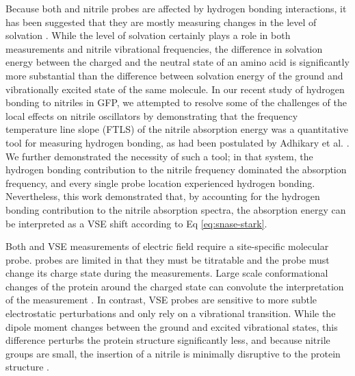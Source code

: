 Because both \pKa{} and nitrile probes are affected by hydrogen bonding interactions, it has been suggested that they are mostly measuring changes in the level of solvation \cite{Adhikary2014, Adhikary2015, Simonson2004}. 
While the level of solvation certainly plays a role in both \dpKa{} measurements and nitrile vibrational frequencies, the difference in solvation energy between the charged and the neutral state of an amino acid is significantly more substantial than the difference between solvation energy of the ground and vibrationally excited state of the same molecule. 
In our recent study of hydrogen bonding to nitriles in GFP, we attempted to resolve some of the challenges of the local effects on nitrile oscillators by demonstrating that the frequency temperature line slope (FTLS) of the nitrile absorption energy was a quantitative tool for measuring hydrogen bonding, as had been postulated by Adhikary et al. \cite{First2018, Adhikary2015}. 
We further demonstrated the necessity of such a tool; 
in that system, the hydrogen bonding contribution to the nitrile frequency dominated the absorption frequency, and every single probe location experienced hydrogen bonding. 
Nevertheless, this work demonstrated that, by accounting for the hydrogen bonding contribution to the nitrile absorption spectra, the absorption energy can be interpreted as a VSE shift according to Eq \ref{eq:snase-stark}.

Both \dpKa{} and VSE measurements of electric field require a site-specific molecular probe. 
\pKa{} probes are limited in that they must be titratable and the probe must change its charge state during the measurements. 
Large scale conformational changes of the protein around the charged state can convolute the interpretation of the \pKa{} measurement \cite{Isom2010, Isom2011, Harms2011}. 
In contrast, VSE probes are sensitive to more subtle electrostatic perturbations and only rely on a vibrational transition. 
While the dipole moment changes between the ground and excited vibrational states, this difference perturbs the protein structure significantly less, and because nitrile groups are small, the insertion of a nitrile is minimally disruptive to the protein structure \cite{Dippel2016}.

